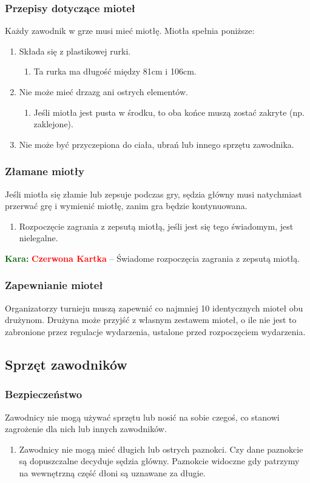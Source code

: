 \documentclass[11pt,a4paper]{article}
\newcommand\redcard[1]{\bgroup\textcolor{darkgreen}{\textbf{Kara: }}\bgroup\textcolor{red}{\textbf{Czerwona Kartka}} -- #1}
\begin{document}
\subsubsection{Przepisy dotyczące mioteł}
Każdy zawodnik w grze musi mieć miotłę. Miotła spełnia poniższe:
\begin{enumerate}
  \item Składa się z plastikowej rurki.
  \begin{enumerate}
    \item Ta rurka ma długość między 81cm i 106cm.
  \end{enumerate}
  \item Nie może mieć drzazg ani ostrych elementów.
  \begin{enumerate}
    \item Jeśli miotła jest pusta w środku, to oba końce muszą zostać zakryte (np. zaklejone).
  \end{enumerate}
  \item Nie może być przyczepiona do ciała, ubrań lub innego sprzętu zawodnika.
\end{enumerate}

\subsubsection{Złamane miotły}
Jeśli miotła się złamie lub zepsuje podczas gry, sędzia główny musi natychmiast przerwać grę i wymienić miotłę, zanim gra będzie kontynuowana.
\begin{enumerate}
  \item Rozpoczęcie zagrania z zepsutą miotłą, jeśli jest się tego świadomym, jest nielegalne.
\end{enumerate}

\redcard{Świadome rozpoczęcia zagrania z zepsutą miotłą.}

\subsubsection{Zapewnianie mioteł}
Organizatorzy turnieju muszą zapewnić co najmniej 10 identycznych mioteł obu drużynom. Drużyna może przyjść z własnym zestawem mioteł, o ile nie jest to zabronione przez regulacje wydarzenia, ustalone przed rozpoczęciem wydarzenia.

\subsection{Sprzęt zawodników}

\subsubsection{Bezpieczeństwo}
Zawodnicy nie mogą używać sprzętu lub nosić na sobie czegoś, co stanowi zagrożenie dla nich lub innych zawodników.
\begin{enumerate}
  \item Zawodnicy nie mogą mieć długich lub ostrych paznokci. Czy dane paznokcie są dopuszczalne decyduje sędzia główny. Paznokcie widoczne gdy patrzymy na wewnętrzną część dłoni są uznawane za długie.
\end{enumerate}
\end{document}
